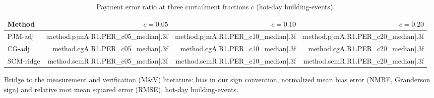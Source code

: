 \begin{table}[htbp]
\centering
\caption{Payment error ratio at three curtailment fractions $c$ (hot-day building-events).}\label{tabS:per}
\small
\begin{tabular}{@{}lrrr@{}}
\toprule
Method & $c=0.05$ & $c=0.10$ & $c=0.20$ \\
\midrule
PJM-adj & {{method.pjmA.R1.PER_c05_median|.3f}} & {{method.pjmA.R1.PER_c10_median|.3f}} & {{method.pjmA.R1.PER_c20_median|.3f}} \\
CG-adj & {{method.cgA.R1.PER_c05_median|.3f}} & {{method.cgA.R1.PER_c10_median|.3f}} & {{method.cgA.R1.PER_c20_median|.3f}} \\
SCM-ridge & {{method.scmR.R1.PER_c05_median|.3f}} & {{method.scmR.R1.PER_c10_median|.3f}} & {{method.scmR.R1.PER_c20_median|.3f}} \\
\bottomrule
\end{tabular}
\par{}
\end{table}

\begin{table}[htbp]
\centering
\caption{Bridge to the measurement and verification (M\&V) literature: bias in our sign convention, normalized mean bias error (NMBE, Granderson sign) and relative root mean squared error (RMSE), hot-day building-events.}\label{tab:bridge}
\small

\end{table}

